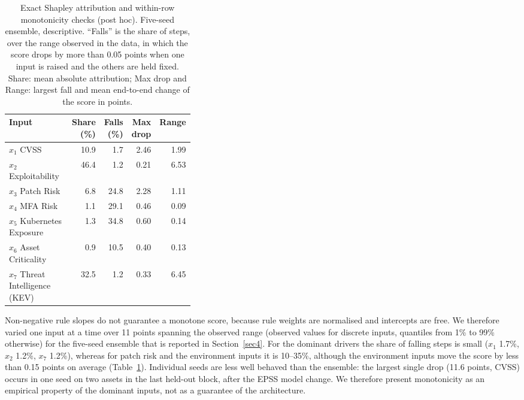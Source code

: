\documentclass[referee,lineno,pdflatex,sn-basic]{sn-jnl}%
\theoremstyle{thmstyleone}%
\theoremstyle{thmstyletwo}%
\theoremstyle{thmstylethree}%
\begin{document}
\begin{table}[ht]
\caption{Exact Shapley attribution and within-row monotonicity checks (post hoc). Five-seed ensemble, descriptive. ``Falls'' is the share of steps, over the range observed in the data, in which the score drops by more than 0.05 points when one input is raised and the others are held fixed. Share: mean absolute attribution; Max drop and Range: largest fall and mean end-to-end change of the score in points.}\label{tab:e8}
\begin{tabular}{@{}p{0.36\linewidth}rrrr@{}}
\hline
Input & Share (\%) & Falls (\%) & Max drop & Range\\
\hline
$x_1$ CVSS & 10.9 & 1.7 & 2.46 & 1.99\\
$x_2$ Exploitability & 46.4 & 1.2 & 0.21 & 6.53\\
$x_3$ Patch Risk & 6.8 & 24.8 & 2.28 & 1.11\\
$x_4$ MFA Risk & 1.1 & 29.1 & 0.46 & 0.09\\
$x_5$ Kubernetes Exposure & 1.3 & 34.8 & 0.60 & 0.14\\
$x_6$ Asset Criticality & 0.9 & 10.5 & 0.40 & 0.13\\
$x_7$ Threat Intelligence (KEV) & 32.5 & 1.2 & 0.33 & 6.45\\
\hline
\end{tabular}
\end{table}

Non-negative rule slopes do not guarantee a monotone score, because rule weights are normalised and intercepts are free. We therefore varied one input at a time over 11 points spanning the observed range (observed values for discrete inputs, quantiles from 1\% to 99\% otherwise) for the five-seed ensemble that is reported in Section~\ref{sec4}. For the dominant drivers the share of falling steps is small ($x_1$ 1.7\%, $x_2$ 1.2\%, $x_7$ 1.2\%), whereas for patch risk and the environment inputs it is 10--35\%, although the environment inputs move the score by less than 0.15 points on average (Table~\ref{tab:e8}). Individual seeds are less well behaved than the ensemble: the largest single drop (11.6 points, CVSS) occurs in one seed on two assets in the last held-out block, after the EPSS model change. We therefore present monotonicity as an empirical property of the dominant inputs, not as a guarantee of the architecture.
\end{document}
